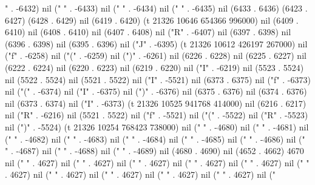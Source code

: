 " . -6432) nil (" " . -6433) nil (" " . -6434) nil (" " . -6435) nil (6433 . 6436) (6423 . 6427) (6428 . 6429) nil (6419 . 6420) (t 21326 10646 654366 996000) nil (6409 . 6410) nil (6408 . 6410) nil (6407 . 6408) nil ("R" . -6407) nil (6397 . 6398) nil (6396 . 6398) nil (6395 . 6396) nil ("J" . -6395) (t 21326 10612 426197 267000) nil ("f" . -6258) nil ("(" . -6259) nil (")" . -6261) nil (6226 . 6228) nil (6225 . 6227) nil (6222 . 6224) nil (6220 . 6223) nil (6219 . 6220) nil ("I" . -6219) nil (5523 . 5524) nil (5522 . 5524) nil (5521 . 5522) nil ("I" . -5521) nil (6373 . 6375) nil ("f" . -6373) nil ("(" . -6374) nil ("I" . -6375) nil (")" . -6376) nil (6375 . 6376) nil (6374 . 6376) nil (6373 . 6374) nil ("I" . -6373) (t 21326 10525 941768 414000) nil (6216 . 6217) nil ("R" . -6216) nil (5521 . 5522) nil ("f" . -5521) nil ("(" . -5522) nil ("R" . -5523) nil (")" . -5524) (t 21326 10254 768423 738000) nil ("
" . -4680) nil (" " . -4681) nil (" " . -4682) nil (" " . -4683) nil (" " . -4684) nil (" " . -4685) nil (" " . -4686) nil (" " . -4687) nil (" " . -4688) nil (" " . -4689) nil (4680 . 4690) nil (4652 . 4662) 4670 nil (" " . 4627) nil (" " . 4627) nil (" " . 4627) nil (" " . 4627) nil (" " . 4627) nil (" " . 4627) nil (" " . 4627) nil (" " . 4627) nil (" " . 4627) nil ("
" . 4627) nil ("
